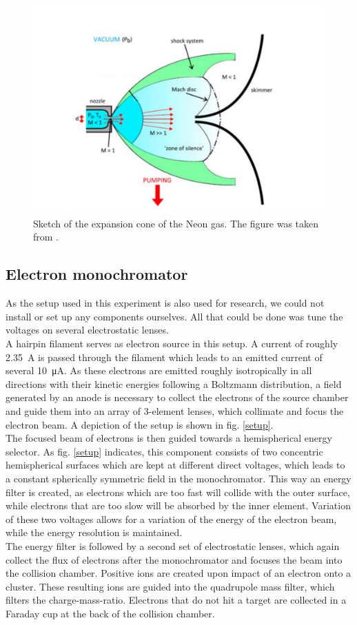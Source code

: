 \documentclass[a4paper,10pt]{article}
\begin{document}
\begin{figure}[htp!]
	\centering
	\includegraphics[width = 0.6 \textwidth]{expansion.png}
	\caption{Sketch of the expansion cone of the Neon gas. The figure was taken from \cite{script}. }
	\label{fig_expansion}
\end{figure}

\subsection{Electron monochromator}
As the setup used in this experiment is also used for research, we could not install or set up any components ourselves. All that could be done was tune the voltages on several electrostatic lenses.
\\
A hairpin filament serves as electron source in this setup. A current of roughly \SI{2.35}{\ampere} is passed through the filament which leads to an emitted current of several \SI{10}{\micro \ampere}. As these electrons are emitted roughly isotropically in all directions with their kinetic energies following a Boltzmann distribution, a field generated by an anode is necessary to collect the electrons of the source chamber and guide them into an array of 3-element lenses, which collimate and focus the electron beam. A depiction of the setup is shown in fig. \ref{setup}.
\\
The focused beam of electrons is then guided towards a hemispherical energy selector. As fig. \ref{setup} indicates, this component consists of two concentric hemispherical surfaces which are kept at different direct voltages, which leads to a constant spherically symmetric field in the monochromator. This way an energy filter is created, as electrons which are too fast will collide with the outer surface, while electrons that are too slow will be absorbed by the inner element. Variation of these two voltages allows for a variation of the energy of the electron beam, while the energy resolution is maintained.
\\
The energy filter is followed by a second set of electrostatic lenses, which again collect the flux of electrons after the monochromator and focuses the beam into the collision chamber. Positive ions are created upon impact of an electron onto a cluster. These resulting ions are guided into the quadrupole mass filter, which filters the charge-mass-ratio. Electrons that do not hit a target are collected in a Faraday cup at the back of the collision chamber.
\end{document}
